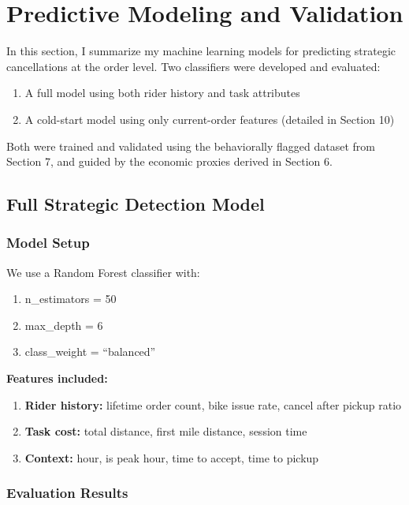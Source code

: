\section{Predictive Modeling and Validation}

In this section, I summarize my machine learning models for predicting strategic cancellations at the order level. Two classifiers were developed and evaluated:

\begin{enumerate}
    \item A full model using both rider history and task attributes
    \item A cold-start model using only current-order features (detailed in Section 10)
\end{enumerate}

Both were trained and validated using the behaviorally flagged dataset from Section 7, and guided by the economic proxies derived in Section 6.

\subsection{Full Strategic Detection Model}

\subsubsection{Model Setup}

We use a Random Forest classifier with:

\begin{enumerate}
    \item n\_estimators = 50
    \item max\_depth = 6
    \item class\_weight = ``balanced''
\end{enumerate}

\textbf{Features included:}
\begin{enumerate}
    \item \textbf{Rider history:} lifetime order count, bike issue rate, cancel after pickup ratio
    \item \textbf{Task cost:} total distance, first mile distance, session time
    \item \textbf{Context:} hour, is peak hour, time to accept, time to pickup
\end{enumerate}

\subsubsection{Evaluation Results}

